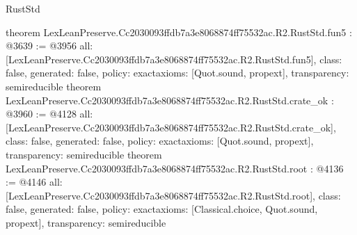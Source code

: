 \begin{lexlean}{RustStd}
\begin{coremodule}
{}
theorem LexLeanPreserve.Cc2030093ffdb7a3e8068874ff75532ac.R2.RustStd.fun5 : @3639 := @3956 {
  all: [LexLeanPreserve.Cc2030093ffdb7a3e8068874ff75532ac.R2.RustStd.fun5],
  class: false,
  generated: false,
  policy: exact{axioms: [Quot.sound, propext]},
  transparency: semireducible
}
theorem LexLeanPreserve.Cc2030093ffdb7a3e8068874ff75532ac.R2.RustStd.crate_ok : @3960 := @4128 {
  all: [LexLeanPreserve.Cc2030093ffdb7a3e8068874ff75532ac.R2.RustStd.crate_ok],
  class: false,
  generated: false,
  policy: exact{axioms: [Quot.sound, propext]},
  transparency: semireducible
}
theorem LexLeanPreserve.Cc2030093ffdb7a3e8068874ff75532ac.R2.RustStd.root : @4136 := @4146 {
  all: [LexLeanPreserve.Cc2030093ffdb7a3e8068874ff75532ac.R2.RustStd.root],
  class: false,
  generated: false,
  policy: exact{axioms: [Classical.choice, Quot.sound, propext]},
  transparency: semireducible
}


\end{coremodule}
\end{lexlean}
